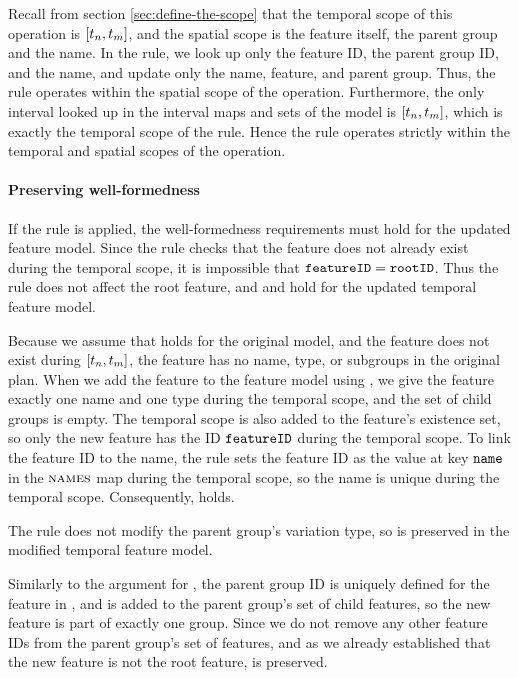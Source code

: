 Recall from section \vref{sec:define-the-scope} that the temporal scope of this operation is $\interval{t_n}{t_m}$, and the spatial scope is the feature itself, the parent group and the name. In the rule, we look up only the feature ID, the parent group ID, and the name, and update only the name, feature, and parent group. Thus, the rule operates within the spatial scope of the operation. Furthermore, the only interval looked up in the interval maps and sets of the model is $\interval{t_n}{t_m}$, which is exactly the temporal scope of the rule. Hence the rule operates strictly within the temporal and spatial scopes of the operation.

\paragraph{Preserving well-formedness}

If the rule is applied, the well-formedness requirements must hold for the updated feature model. 
Since the rule checks that the feature does not already exist during the temporal scope, it is impossible that $\texttt{featureID} = \texttt{rootID}$. Thus the rule does not affect the root feature, and  and  hold for the updated temporal feature model.

Because we assume that  holds for the original model, and the feature does not exist during $\interval{t_n}{t_m}$, the feature has no name, type, or subgroups in the original plan. When we add the feature to the feature model using , we give the feature exactly one name and one type during the temporal scope, and the set of child groups is empty. The temporal scope is also added to the feature's existence set, so only the new feature has the ID $\texttt{featureID}$ during the temporal scope. To link the feature ID to the name, the rule sets the feature ID as the value at key $\texttt{name}$ in the $\textsc{names}{}$ map during the temporal scope, so the name is unique during the temporal scope.
Consequently,  holds.

The rule does not modify the parent group's variation type, so  is preserved in the modified temporal feature model.

Similarly to the argument for , the parent group ID is uniquely defined for the feature in , and  is added to the parent group's set of child features, so the new feature is part of exactly one group. Since we do not remove any other feature IDs from the parent group's set of features, and as we already established that the new feature is not the root feature,  is preserved.

